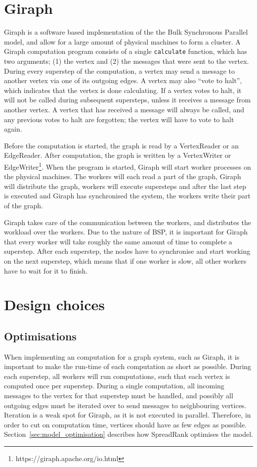 \section{Giraph}
Giraph is a software based implementation of the the Bulk Synchronous Parallel model,
 and allow for a large amount of physical machines to form a cluster.
A Giraph computation program consists of a single \verb"calculate" function, which has two arguments; (1) the vertex and (2) the messages that were sent to the vertex.
During every superstep of the computation, a vertex may send a message to another vertex via one of its outgoing edges.
A vertex may also ``vote to halt'', which indicates that the vertex is done calculating.
If a vertex votes to halt, it will not be called during subsequent supersteps, unless it receives a message from another vertex.
A vertex that has received a message will always be called, and any previous votes to halt are forgotten; the vertex will have to vote to halt again.

Before the computation is started, the graph is read by a VertexReader or an EdgeReader.
After computation, the graph is written by a VertexWriter or EdgeWriter\footnote{https://giraph.apache.org/io.html}.
When the program is started, Giraph will start worker processes on the physical machines.
The workers will each read a part of the graph, Giraph will distribute the graph, workers will execute supersteps and after the last step is executed and Giraph has synchronised the system, the workers write their part of the graph.

Giraph takes care of the communication between the workers, and distributes the workload over the workers.
Due to the nature of BSP, it is important for Giraph that every worker will take roughly the same amount of time to complete a superstep.
After each superstep, the nodes have to synchronise and start working on the next superstep, which means that if one worker is slow, all other workers have to wait for it to finish.

\section{Design choices}
\subsection{Optimisations}
When implementing an computation for a graph system, such as Giraph, it is important to make the run-time of each computation as short as possible.
During each superstep, all workers will run computations, such that each vertex is computed once per superstep.
During a single computation, all incoming messages to the vertex for that superstep must be handled, and possibly all outgoing edges must be iterated over to send messages to neighbouring vertices.
Iteration is a weak spot for Giraph, as it is not executed in parallel.
Therefore, in order to cut on computation time, vertices should have as few edges as possible.
Section~\ref{sec:model_optimisation} describes how SpreadRank optimises the model.





